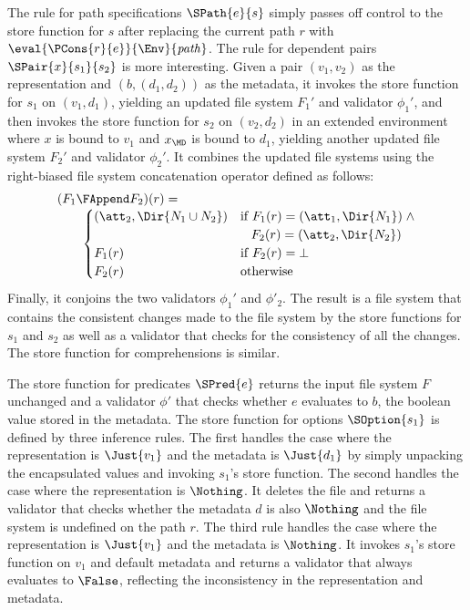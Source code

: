 The rule for path specifications $\SPath{e}{s}$ simply passes off
control to the store function for $s$ after replacing the current path
$r$ with $\eval{\PCons{r}{e}}{\Env}{\mathit{path}}$. The rule for
dependent pairs $\SPair{x}{s_1}{s_2}$ is more interesting. Given a
pair $(v_1,v_2)$ as the representation and $(b,(d_1,d_2))$ as the
metadata, it invokes the store function for $s_1$ on $(v_1,d_1)$,
yielding an updated file system $F_1'$ and validator $\phi_1'$, and
then invokes the store function for $s_2$ on $(v_2,d_2)$ in an
extended environment where $x$ is bound to $v_1$ and $x_{\MD}$ is
bound to $d_1$, yielding another updated file system $F_2'$ and
validator $\phi_2'$. It combines the updated file systems using the
right-biased file system concatenation operator defined as follows:
%
\[
\begin{array}{l}
(F_1 \FAppend F_2)(r) = \\
\qquad 
\begin{cases}
  (\att_2,\Dir{N_1 \cup N_2}) & \text{if}~F_1(r) = (\att_1,\Dir{N_1}) \; \wedge \\
                              & \;\;\; F_2(r) = (\att_2,\Dir{N_2})\\
  F_1(r) & \text{if}~F_2(r) = \bot\\
  F_2(r) & \text{otherwise}\\
\end{cases}
\end{array}
\]
%
Finally, it conjoins the two validators $\phi_1'$ and $\phi'_2$. The
result is a file system that contains the consistent changes made to
the file system by the store functions for $s_1$ and $s_2$ as well as
a validator that checks for the consistency of all the changes. The
store function for comprehensions is similar.

The store function for predicates $\SPred{e}$ returns the input file
system $F$ unchanged and a validator $\phi'$ that checks whether $e$
evaluates to $b$, the boolean value stored in the metadata. The store
function for options $\SOption{s_1}$ is defined by three inference
rules. The first handles the case where the representation is
$\Just{v_1}$ and the metadata is $\Just{d_1}$ by simply unpacking the
encapsulated values and invoking $s_1$'s store function. The second
handles the case where the representation is $\Nothing$. It deletes
the file and returns a validator that checks whether the metadata $d$
is also $\Nothing$ and the file system is undefined on the path
$r$. The third rule handles the case where the representation is
$\Just{v_1}$ and the metadata is $\Nothing$. It invokes $s_1$'s store
function on $v_1$ and default metadata and returns a validator that
always evaluates to $\False$, reflecting the inconsistency in the
representation and metadata.

